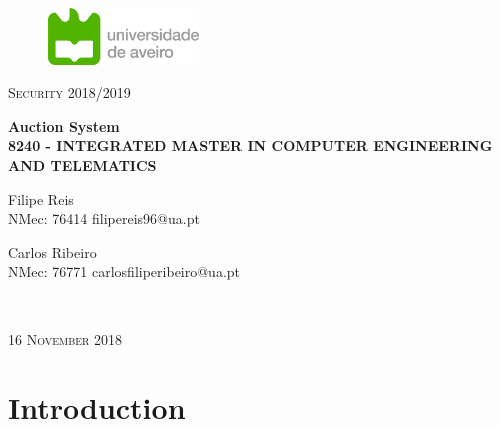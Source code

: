 \documentclass[pdftex,12pt,a4paper]{report}
\begin{document}
\begin{figure}[h]
\center
\includegraphics[height=1.5cm]{logo_UA.png}
\end{figure}
\begin{center}


\textsc{\large Security 2018/2019\\[2cm]}

{ \huge \bfseries Auction System \\[4cm]

\textsc{\small{8240 - INTEGRATED MASTER IN COMPUTER ENGINEERING AND TELEMATICS}}\\[2cm]
}
\end{center}

\begin{minipage}{0.4\textwidth}

\begin{flushleft} \large
Filipe Reis
\small{\\NMec: 76414}
\small{filipereis96@ua.pt}
\end{flushleft}
\end{minipage}
\begin{minipage}{0.4\textwidth}

\begin{flushright} \large
Carlos Ribeiro
\small{\\NMec: 76771}
\small{carlosfiliperibeiro@ua.pt}
\end{flushright}
\end{minipage}\\[1cm]

\vfill

\begin{center}
\textsc{\large 16 November 2018\\[2cm]}
\end{center}





\tableofcontents

\renewcommand{\thechapter}{}

\clearpage

\section{Introduction}
\end{document}
